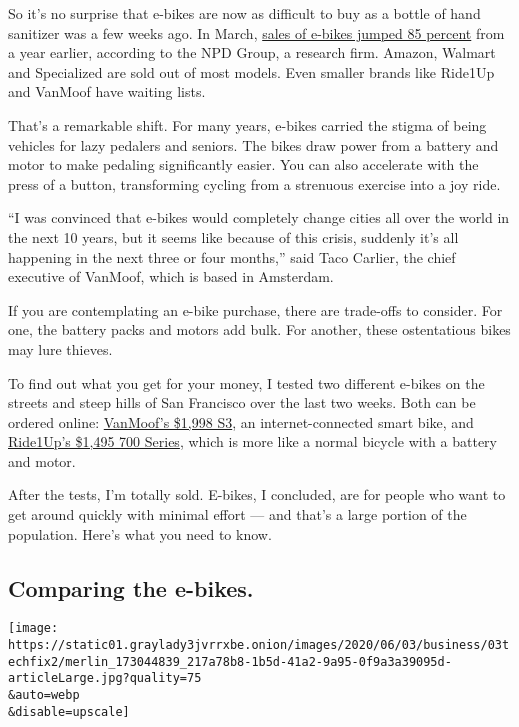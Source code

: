 So it's no surprise that e-bikes are now as difficult to buy as a bottle
of hand sanitizer was a few weeks ago. In March,
\href{https://www.nytimes3xbfgragh.onion/2020/05/18/nyregion/bike-shortage-coronavirus.html}{sales
of e-bikes jumped 85 percent} from a year earlier, according to the NPD
Group, a research firm. Amazon, Walmart and Specialized are sold out of
most models. Even smaller brands like Ride1Up and VanMoof have waiting
lists.

That's a remarkable shift. For many years, e-bikes carried the stigma of
being vehicles for lazy pedalers and seniors. The bikes draw power from
a battery and motor to make pedaling significantly easier. You can also
accelerate with the press of a button, transforming cycling from a
strenuous exercise into a joy ride.

``I was convinced that e-bikes would completely change cities all over
the world in the next 10 years, but it seems like because of this
crisis, suddenly it's all happening in the next three or four months,''
said Taco Carlier, the chief executive of VanMoof, which is based in
Amsterdam.

If you are contemplating an e-bike purchase, there are trade-offs to
consider. For one, the battery packs and motors add bulk. For another,
these ostentatious bikes may lure thieves.

To find out what you get for your money, I tested two different e-bikes
on the streets and steep hills of San Francisco over the last two weeks.
Both can be ordered online:
\href{https://www.vanmoof.com/en-US}{VanMoof's \$1,998 S3}, an
internet-connected smart bike, and
\href{https://ride1up.com/product/700-series/}{Ride1Up's \$1,495 700
Series}, which is more like a normal bicycle with a battery and motor.

After the tests, I'm totally sold. E-bikes, I concluded, are for people
who want to get around quickly with minimal effort --- and that's a
large portion of the population. Here's what you need to know.

\hypertarget{comparing-the-e-bikes}{%
\subsection{Comparing the e-bikes.}\label{comparing-the-e-bikes}}

\texttt{[image: https://static01.graylady3jvrrxbe.onion/images/2020/06/03/business/03techfix2/merlin\_173044839\_217a78b8-1b5d-41a2-9a95-0f9a3a39095d-articleLarge.jpg?quality=75\\\&auto=webp\\\&disable=upscale]}

